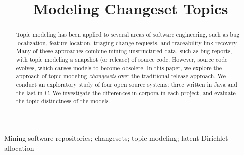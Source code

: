 \documentclass[conference]{IEEEtran}
\begin{document}
\title{Modeling Changeset Topics}
\author{

    \and


    \and

}


\maketitle

\begin{abstract}
Topic modeling has been applied to several areas of software engineering,
such as bug localization, feature location, triaging change requests,
and traceability link recovery.
Many of these approaches combine mining unstructured data, such as bug
reports, with topic modeling a snapshot (or release) of source code.
However, source code evolves, which causes models to become obsolete.
In this paper, we explore the approach of topic modeling \emph{changesets}
over the traditional release approach.
We conduct an exploratory study of four open source systems:
three written in Java and the last in C.
We investigate the differences in corpora in each project,
and evaluate the topic distinctness of the models.
\end{abstract}

\begin{IEEEkeywords}
Mining software repositories;
changesets;
topic modeling;
latent Dirichlet allocation
\end{IEEEkeywords}
\end{document}
